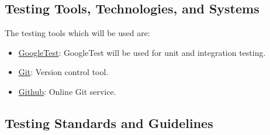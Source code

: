 \subsection{Testing Tools, Technologies, and Systems}

The testing tools which will be used are:
\begin{itemize}
    \item \href{https://google.github.io/googletest/}{GoogleTest}: GoogleTest will be used for unit and integration testing.
    \item \href{https://git-scm.com/}{Git}: Version control tool.
    \item \href{https://github.com/}{Github}: Online Git service.
\end{itemize}

\subsection{Testing Standards and Guidelines}

